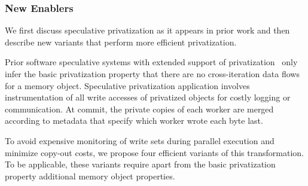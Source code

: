 \subsubsection{New Enablers}
\label{novel_transf}

%

We first discuss speculative privatization as it appears in prior work
and then describe new variants that perform more efficient
privatization.

Prior software speculative systems with extended support of
privatization~\cite{johnson:12:pldi,kim:12:cgo} only infer the basic
privatization property that there are no cross-iteration data flows
for a memory object.
%
Speculative privatization application involves instrumentation of all
write accesses of privatized objects for costly logging or
communication. At commit, the private copies of each worker are merged
according to metadata that specify which worker wrote each byte last.

To avoid expensive monitoring of write sets during parallel execution
and minimize copy-out costs, we propose four efficient variants of
this transformation.
%
To be applicable, these variants require apart from the basic
privatization property additional memory object properties.



